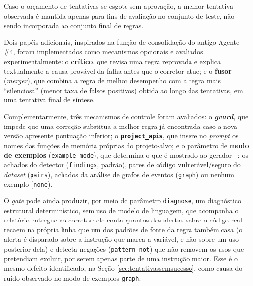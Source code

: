 \documentclass[
    12pt,                %
    openright,           %
    oneside,             %
    a4paper,             %
    english,             %
    brazil               %
]{abntex2}
\newcommand{\antigo}[1]{\sout{#1}}
\newcommand{\novo}[1]{{\color{red}#1}}
\begin{document}
Caso o orçamento de tentativas se esgote sem aprovação, a melhor tentativa observada é mantida apenas para fins de avaliação no conjunto de teste, não sendo incorporada ao conjunto final de regras.
\par
Dois papéis adicionais, inspirados na função de consolidação do antigo Agente \#4, foram implementados como mecanismos opcionais e avaliados experimentalmente: o \textbf{crítico}, que revisa uma regra reprovada e explica textualmente a causa provável da falha antes que o corretor atue; e o \textbf{fusor} (\textit{merger}), que combina a regra de melhor desempenho com a regra mais ``silenciosa'' (menor taxa de falsos positivos) obtida ao longo das tentativas, em uma tentativa final de síntese.
\par
Complementarmente, três mecanismos de controle foram avaliados: o \textbf{\textit{guard}}, que impede que uma correção substitua a melhor regra já encontrada caso a nova versão apresente pontuação inferior; o \textbf{\texttt{project\_apis}}, que insere no \textit{prompt} os nomes das funções de memória próprias do projeto-alvo; e o parâmetro de \textbf{modo de exemplos} (\texttt{example\_mode}), que determina o que é mostrado ao gerador\antigo{ --}\novo{:} os achados do detector (\texttt{findings}, padrão), pares de código vulnerável/seguro do \textit{dataset} (\texttt{pairs}), achados da análise de grafos de eventos (\texttt{graph}) ou nenhum exemplo (\texttt{none}).
\par
\novo{O \textit{gate} pode ainda produzir, por meio do parâmetro \texttt{diagnose}, um diagnóstico estrutural determinístico, sem uso de modelo de linguagem, que acompanha o relatório entregue ao corretor: ele conta quantos dos alertas sobre o código real recaem na própria linha que um dos padrões de fonte da regra também casa (o alerta é disparado sobre a instrução que marca a variável, e não sobre um uso posterior dela) e detecta negações (\texttt{pattern-not}) que não removem os usos que pretendiam excluir, por serem apenas parte de uma instrução maior. Esse é o mesmo defeito identificado, na Seção \ref{sec:tentativassemsucesso}, como causa do ruído observado no modo de exemplos \texttt{graph}.}
\end{document}
